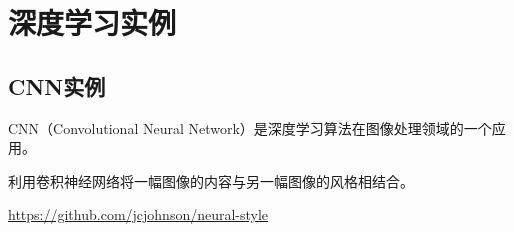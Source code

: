 \chapter{深度学习实例}
\section{CNN实例}
CNN（Convolutional Neural Network）是深度学习算法在图像处理领域的一个应用。

利用卷积神经网络将一幅图像的内容与另一幅图像的风格相结合。

\url{https://github.com/jcjohnson/neural-style}